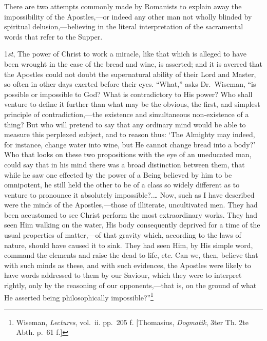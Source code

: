 \documentclass[english,]{book}
\begin{document}
There are two attempts commonly made by Romanists to explain away the impossibility of the Apostles,---or indeed any other man not wholly blinded by spiritual delusion,---believing in the literal interpretation of the sacramental words that refer to the Supper.

1\emph{st}, The power of Christ to work a miracle, like that which is alleged to have been wrought in the case of the bread and wine, is asserted; and it is averred that the Apostles could not doubt the supernatural ability of their Lord and Master, so often in other days exerted before their eyes. ``What,'' asks Dr.~Wiseman, ``is possible or impossible to God? What is contradictory to His power? Who shall venture to define it further than what may be the obvious, the first, and simplest principle of contradiction,---the existence and simultaneous non-existence of a thing? But who will pretend to say that any ordinary mind would be able to measure this perplexed subject, and to reason thus: `The Almighty may indeed, for instance, change water into wine, but He cannot change bread into a body?' Who that looks on these two propositions with the eye of an uneducated man, could say that in his mind there was a broad distinction between them, that while he saw one effected by the power of a Being believed by him to be omnipotent, he still held the other to be of a class so widely different as to venture to pronounce it absolutely impossible?.\ldots{} Now, such as I have described were the minds of the Apostles,---those of illiterate, uncultivated men. They had been accustomed to see Christ perform the most extraordinary works. They had seen Him walking on the water, His body consequently deprived for a time of the usual properties of matter,---of that gravity which, according to the laws of nature, should have caused it to sink. They had seen Him, by His simple word, command the elements and raise the dead to life, etc. Can we, then, believe that with such minds as these, and with such evidences, the Apostles were likely to have words addressed to them by our Saviour, which they were to interpret rightly, only by the reasoning of our opponents,---that is, on the ground of what He asserted being philosophically impossible?''\footnote{Wiseman, \emph{Lectures}, vol.~ii. pp.~205 f. {[}Thomasius, \emph{Dogmatik}, 3ter Th. 2te Abth. p.~61 f.{]}}
\end{document}
